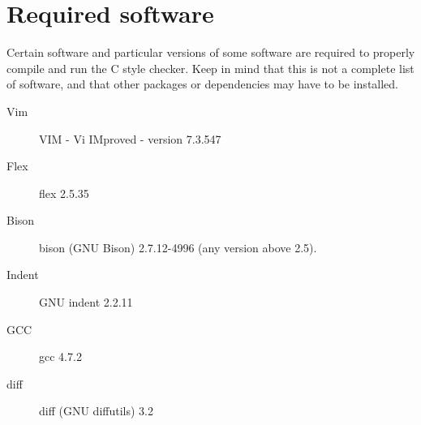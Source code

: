 \chapter{Required software}
\label{chap:software}
Certain software and particular versions of some software are required to
properly compile and run the C style checker.
Keep in mind that this is not a complete list of software, and that other packages or dependencies may
have to be installed.

\begin{description}
    \item[Vim]  VIM - Vi IMproved - version 7.3.547
    \item[Flex] flex 2.5.35
    \item[Bison] bison (GNU Bison) 2.7.12-4996 (any version above 2.5).
    \item[Indent] GNU indent 2.2.11
    \item[GCC] gcc 4.7.2
    \item[diff] diff (GNU diffutils) 3.2
\end{description}
